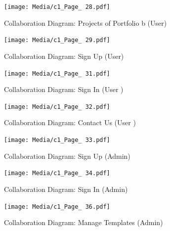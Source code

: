 \documentclass[12pt]{report}
\begin{document}
\begin{figure}[ht]
    \centering
    \texttt{[image: Media/c1\_Page\_ 28.pdf]} %
    \caption{Collaboration Diagram: Projects of Portfolio b (User)}
    \label{fig:drawing1}
\end{figure}

\begin{figure}[ht]
    \centering
    \texttt{[image: Media/c1\_Page\_ 29.pdf]} %
    \caption{Collaboration Diagram: Sign Up (User)}
    \label{fig:drawing1}
\end{figure}


\begin{figure}[ht]
    \centering
    \texttt{[image: Media/c1\_Page\_ 31.pdf]} %
    \caption{Collaboration Diagram: Sign In (User )}
    \label{fig:drawing1}
\end{figure}

\begin{figure}[ht]
    \centering
    \texttt{[image: Media/c1\_Page\_ 32.pdf]} %
    \caption{Collaboration Diagram: Contact Us (User )}
    \label{fig:drawing1}
\end{figure}

\begin{figure}[ht]
    \centering
    \texttt{[image: Media/c1\_Page\_ 33.pdf]} %
    \caption{Collaboration Diagram: Sign Up (Admin)}
    \label{fig:drawing1}
\end{figure}

\begin{figure}[ht]
    \centering
    \texttt{[image: Media/c1\_Page\_ 34.pdf]} %
    \caption{Collaboration Diagram: Sign In (Admin)}
    \label{fig:drawing1}
\end{figure}


\begin{figure}[ht]
    \centering
    \texttt{[image: Media/c1\_Page\_ 36.pdf]} %
    \caption{Collaboration Diagram: Manage Templates (Admin)}
    \label{fig:drawing1}
\end{figure}
\end{document}
